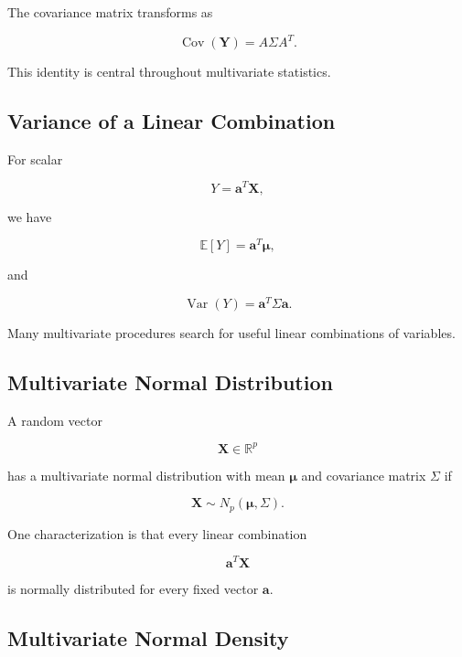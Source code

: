 The covariance matrix transforms as

\[
\boxed{
\operatorname{Cov}(\mathbf{Y})
=
A\Sigma A^T.
}
\]

This identity is central throughout multivariate statistics.

\subsection{Variance of a Linear Combination}
\label{subsec:variance-linear-combination-multivariate}

For scalar

\[
Y
=
\mathbf{a}^T\mathbf{X},
\]

we have

\[
\boxed{
\mathbb{E}[Y]
=
\mathbf{a}^T\boldsymbol{\mu},
}
\]

and

\[
\boxed{
\operatorname{Var}(Y)
=
\mathbf{a}^T\Sigma\mathbf{a}.
}
\]

Many multivariate procedures search for useful linear combinations of
variables.

\subsection{Multivariate Normal Distribution}
\label{subsec:multivariate-normal-distribution}

A random vector

\[
\mathbf{X}\in\mathbb{R}^p
\]

has a multivariate normal distribution with mean
\(\boldsymbol{\mu}\) and covariance matrix \(\Sigma\) if

\[
\boxed{
\mathbf{X}
\sim
N_p
(
\boldsymbol{\mu},
\Sigma
).
}
\]

One characterization is that every linear combination

\[
\boxed{
\mathbf{a}^T\mathbf{X}
}
\]

is normally distributed for every fixed vector \(\mathbf{a}\).

\subsection{Multivariate Normal Density}
\label{subsec:multivariate-normal-density}

